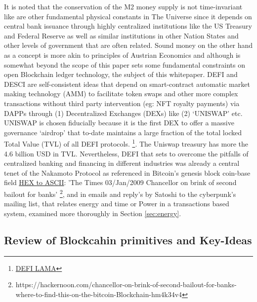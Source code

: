 \documentclass[final,5p,times,twocolumn,authoryear]{elsarticle}
\begin{document}
It is noted that the conservation of the M2 money supply is not time-invariant like are other fundamental physical constants in The Universe since it depends on central bank issuance through highly centralized institutions like the US Treasury and Federal Reserve as well as similar institutions in other Nation States and other levels of  government that are often related. Sound money on the other hand as a concept is more akin to principles of Austrian Economics and although is somewhat beyond the scope of this paper sets some fundamental constraints on open Blockchain ledger technology, the subject of this whitepaper. 
DEFI and DESCI are self-consistent ideas that depend on smart-contract automatic market making technology (AMM) to facilitate token swaps and other more complex transactions without third party intervention (eg: NFT royalty payments) via DAPPs through (1) Decentralized Exchanges (DEXs) like (2) `UNISWAP' etc. UNISWAP is chosen fiducially because it is the first DEX to offer a massive governance `airdrop' that to-date maintains a large fraction of the total locked Total Value (TVL) of all DEFI protocols. \footnote{\href{https://defillama.com/protocols/dexes}{DEFI LAMA}}. The Uniswap treasury has more the 4.6 billion USD in TVL.   Nevertheless, DEFI that sets to overcome the pitfalls of centralized banking and financing in different industries was already a central tenet of the Nakamoto Protocol as referenced in Bitcoin's genesis block \textrm{coin-base field} \href{https://www.Blockchain.com/btc/tx/4a5e1e4baab89f3a32518a88c31bc87f618f76673e2cc77ab2127b7afdeda33b}{HEX to ASCII}:  'The Times 03/Jan/2009 Chancellor on brink of second bailout for banks' \footnote{https://hackernoon.com/chancellor-on-brink-of-second-bailout-for-banks-where-to-find-this-on-the-bitcoin-Blockchain-hm4k34v4}, and in emails and reply's by Satoshi to the cyberpunk's mailing list, that relates energy and time or Power in a transactions based system, examined more thoroughly in Section \ref{sec:energy}.

\subsection{Review of Blockcahin primitives and Key-Ideas}
\label{subsec: review}
\end{document}
